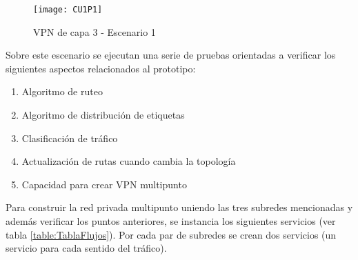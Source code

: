 \begin{figure}[ht!] 
\centering    
\texttt{[image: CU1P1]}
\caption[VPN de capa 3 - Escenario 1]{VPN de capa 3 - Escenario 1}
\label{fig:CUP1}
\end{figure}

Sobre este escenario se ejecutan una serie de pruebas orientadas a verificar los siguientes aspectos relacionados al prototipo:

\begin{enumerate}
\item Algoritmo de ruteo
\item Algoritmo de distribución de etiquetas
\item Clasificaci\'on de tr\'afico
\item Actualizaci\'on de rutas cuando cambia la topolog\'ia
\item Capacidad para crear VPN multipunto
\end{enumerate}

Para construir la red privada multipunto uniendo las tres subredes mencionadas y adem\'as verificar los puntos anteriores, se instancia los siguientes servicios (ver tabla \ref{table:TablaFlujos}). Por cada par de subredes se crean dos servicios (un servicio para cada sentido del tr\'afico).

